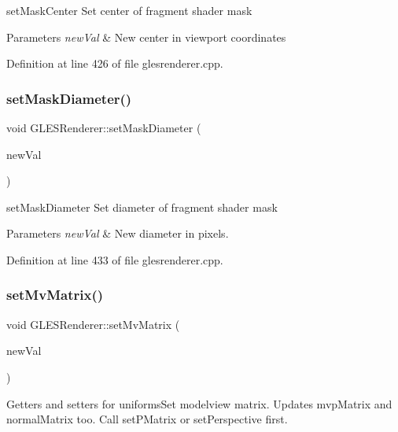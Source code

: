 set\+Mask\+Center Set center of fragment shader mask 


\begin{DoxyParams}{Parameters}
{\em new\+Val} & New center in viewport coordinates \\
\hline
\end{DoxyParams}


Definition at line 426 of file glesrenderer.\+cpp.

\mbox{\label{class_g_l_e_s_renderer_a07c9bfdc4f16745e9b09529e21184910}} 
\subsubsection{\texorpdfstring{setMaskDiameter()}{setMaskDiameter()}}
{\footnotesize\ttfamily void G\+L\+E\+S\+Renderer\+::set\+Mask\+Diameter (\begin{DoxyParamCaption}\item[{float}]{new\+Val }\end{DoxyParamCaption})}



set\+Mask\+Diameter Set diameter of fragment shader mask 


\begin{DoxyParams}{Parameters}
{\em new\+Val} & New diameter in pixels. \\
\hline
\end{DoxyParams}


Definition at line 433 of file glesrenderer.\+cpp.

\mbox{\label{class_g_l_e_s_renderer_a8242d0b241a14c5850867ec00819c014}} 
\subsubsection{\texorpdfstring{setMvMatrix()}{setMvMatrix()}}
{\footnotesize\ttfamily void G\+L\+E\+S\+Renderer\+::set\+Mv\+Matrix (\begin{DoxyParamCaption}\item[{const Q\+Matrix4x4}]{new\+Val }\end{DoxyParamCaption})}

Getters and setters for uniforms\+Set modelview matrix. Updates mvp\+Matrix and normal\+Matrix too. Call set\+P\+Matrix or set\+Perspective first.

